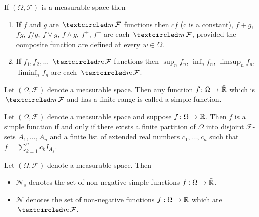 \begin{theorem}
If $(\Omega, \mathcal F)$ is a measurable space then
\begin{enumerate}
\item If $f$ and $g$ are  $\mcirc \mathcal F$ functions then $cf$ (c is a constant), $f+g$, $fg$, $f/g$, $f\vee g$, $f\wedge g$, $f^+$, $f^-$ are each $\mcirc \mathcal F$, provided the composite function are defined at every $w\in\Omega$.
\item If $f_1, f_2,\ldots $  $\mcirc \mathcal F$ functions then $\sup_n f_n$, $\inf_n f_n$, $\limsup_n f_n$, $\liminf_n f_n$ are each $\mcirc \mathcal F$.
\end{enumerate}
\end{theorem}



\begin{definition}
Let $(\Omega, \mathcal F)$ denote a measurable space. Then
any function $f\colon \Omega \rightarrow \bar{\Bbb R}$ which is $\mcirc \mathcal F$ and has a finite range is called a {simple function}.
\end{definition}


\begin{definition}
Let $(\Omega, \mathcal F)$ denote a measurable space and suppose  $f\colon \Omega \rightarrow \bar{\Bbb R}$. Then $f$ is a simple function if and only if there exists a finite partition of $\Omega$ into disjoint $\mathcal F$-sets $A_1,\ldots, A_n$
and a finite list of extended real numbers $c_1,\ldots, c_n$
 such that $f=\sum_{k=1}^n c_k I_{A_k}$.
\end{definition}





\begin{definition}
Let $(\Omega, \mathcal F)$ denote a measurable space. Then
\begin{itemize}
\item $\mathscr N_s$ denotes the set of non-negative simple functions \mbox{$f:\Omega\rightarrow \bar{\Bbb R}$}.
\item $\mathscr N$ denotes the set of non-negative functions $f:\Omega\rightarrow \bar{\Bbb R}$ which are  $\mcirc \mathcal F$.
\end{itemize}
\end{definition}



